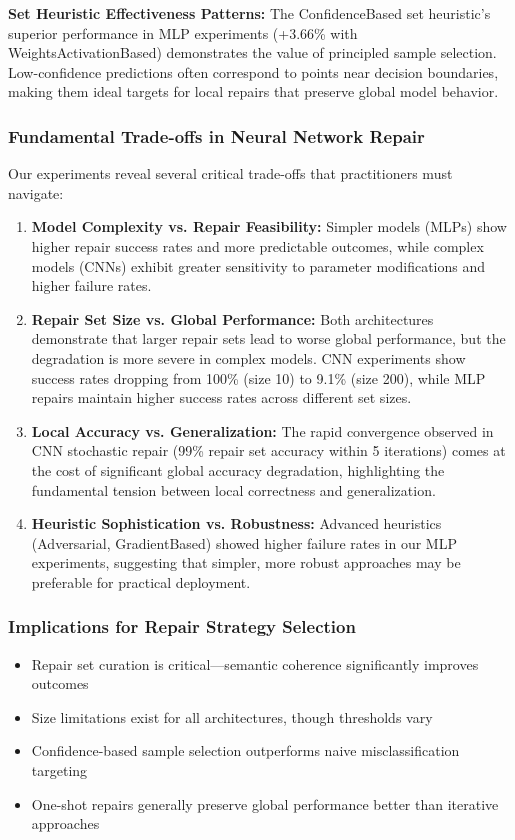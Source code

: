\documentclass{article}
\begin{document}
\begin{description}
\textbf{Set Heuristic Effectiveness Patterns:} The ConfidenceBased set heuristic's superior performance in MLP experiments (+3.66\% with WeightsActivationBased) demonstrates the value of principled sample selection. Low-confidence predictions often correspond to points near decision boundaries, making them ideal targets for local repairs that preserve global model behavior.

\subsubsection{Fundamental Trade-offs in Neural Network Repair}

Our experiments reveal several critical trade-offs that practitioners must navigate:

\begin{enumerate}
	\item \textbf{Model Complexity vs. Repair Feasibility:} Simpler models (MLPs) show higher repair success rates and more predictable outcomes, while complex models (CNNs) exhibit greater sensitivity to parameter modifications and higher failure rates.

	\item \textbf{Repair Set Size vs. Global Performance:} Both architectures demonstrate that larger repair sets lead to worse global performance, but the degradation is more severe in complex models. CNN experiments show success rates dropping from 100\% (size 10) to 9.1\% (size 200), while MLP repairs maintain higher success rates across different set sizes.

	\item \textbf{Local Accuracy vs. Generalization:} The rapid convergence observed in CNN stochastic repair (99\% repair set accuracy within 5 iterations) comes at the cost of significant global accuracy degradation, highlighting the fundamental tension between local correctness and generalization.

	\item \textbf{Heuristic Sophistication vs. Robustness:} Advanced heuristics (Adversarial, GradientBased) showed higher failure rates in our MLP experiments, suggesting that simpler, more robust approaches may be preferable for practical deployment.
\end{enumerate}

\subsubsection{Implications for Repair Strategy Selection}
\begin{itemize}
	\item Repair set curation is critical—semantic coherence significantly improves outcomes
	\item Size limitations exist for all architectures, though thresholds vary
	\item Confidence-based sample selection outperforms naive misclassification targeting
	\item One-shot repairs generally preserve global performance better than iterative approaches
\end{itemize}


\end{description}
\end{document}
